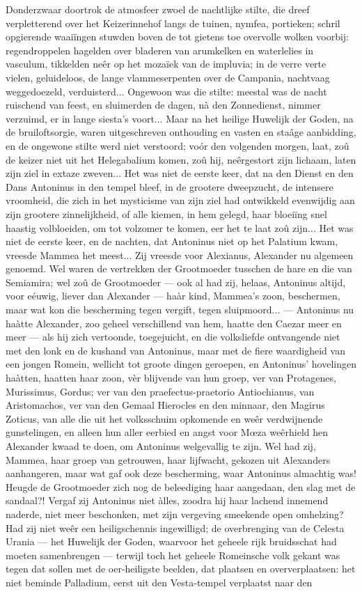 \documentclass[a4paper, 12pt, oneside, dutch]{article}
\begin{document}
Donderzwaar doortrok de atmosfeer zwoel de nachtlijke stilte, die dreef verpletterend over het Keizerinnehof langs de tuinen, nymfea, portieken; schril opgierende waaiïngen stuwden boven de tot gietens toe overvolle wolken voorbij: regendroppelen hagelden over bladeren van arumkelken en waterlelies in vasculum, tikkelden neêr op het mozaïek van de impluvia; in de verre verte vielen, geluideloos, de lange vlammeserpenten over de Campania, nachtvaag weggedoezeld, verduisterd... Ongewoon was die stilte: meestal was de nacht ruischend van feest, en sluimerden de dagen, nà den Zonnedienst, nimmer verzuimd, er in lange siesta's voort... Maar na het heilige Huwelijk der Goden, na de bruiloftsorgie, waren uitgeschreven onthouding en vasten en staâge aanbidding, en de ongewone stilte werd niet verstoord; voór den volgenden morgen, laat, zoû de keizer niet uit het Helegabalium komen, zoû hij, neêrgestort zijn lichaam, laten zijn ziel in extaze zweven... Het was niet de eerste keer, dat na den Dienst en den Dans Antoninus in den tempel bleef, in de grootere dweepzucht, de intensere vroomheid, die zich in het mysticisme van zijn ziel had ontwikkeld evenwijdig aan zijn grootere zinnelijkheid, of alle kiemen, in hem gelegd, haar bloeiïng snel haastig volbloeiden, om tot volzomer te komen, eer het te laat zoû zijn... Het was niet de eerste keer, en de nachten, dat Antoninus niet op het Palatium kwam, vreesde Mammea het meest... Zij vreesde voor Alexianus, Alexander nu algemeen genoemd. Wel waren de vertrekken der Grootmoeder tusschen de hare en die van Semiamira; wel zoû de Grootmoeder --- ook al had zij, helaas, Antoninus altijd, voor eéuwig, liever dan Alexander --- haàr kind, Mammea's zoon, beschermen, maar wat kon die bescherming tegen vergift, tegen sluipmoord... --- Antoninus nu haàtte Alexander, zoo geheel verschillend van hem, haatte den Caezar meer en meer --- als hij zich vertoonde, toegejuicht, en die volksliefde ontvangende niet met den lonk en de kushand van Antoninus, maar met de fiere waardigheid van een jongen Romein, wellicht tot groote dingen geroepen, en Antoninus' hovelingen haàtten, haatten haar zoon, vèr blijvende van hun groep, ver van Protagenes, Murissimus, Gordus; ver van den praefectus-praetorio Antiochianus, van Aristomachos, ver van den Gemaal Hierocles en den minnaar, den Magirus Zoticus, van alle die uit het volksschuim opkomende en weêr verdwijnende gunstelingen, en alleen hun aller eerbied en angst voor Mœza weêrhield hen Alexander kwaad te doen, om Antoninus welgevallig te zijn. Wel had zij, Mammea, haar groep van getrouwen, haar lijfwacht, gekozen uit Alexanders aanhangeren, maar wat gaf ook deze bescherming, waar Antoninus almachtig was! Heugde de Grootmoeder zich nog de beleediging haar aangedaan, den slag met de sandaal?! Vergaf zij Antoninus niet àlles, zoodra hij haar lachend innemend naderde, niet meer beschonken, met zijn vergeving smeekende open omhelzing? Had zij niet weêr een heiligschennis ingewilligd; de overbrenging van de Celesta Urania --- het Huwelijk der Goden, waarvoor het geheele rijk bruidsschat had moeten samenbrengen --- terwijl toch het geheele Romeinsche volk gekant was tegen dat sollen met de oer-heiligste beelden, dat plaatsen en oververplaatsen: het niet beminde Palladium, eerst uit den Vesta-tempel verplaatst naar den 
\end{document}
